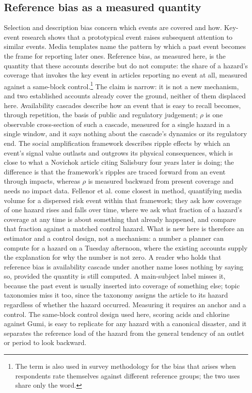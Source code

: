 \documentclass[1p,times]{elsarticle}
\begin{document}
\subsection{Reference bias as a measured quantity}
Selection and description bias \cite{earl2004,strawn2008,zhang2023} concern which events are covered and how. Key-event research \cite{kepplinger1995,brosius1995} shows that a prototypical event raises subsequent attention to similar events. Media templates \cite{kitzinger2000} name the pattern by which a past event becomes the frame for reporting later ones. Reference bias, as measured here, is the quantity that these accounts describe but do not compute: the share of a hazard's coverage that invokes the key event in articles reporting no event at all, measured against a same-block control.\footnote{The term is also used in survey methodology for the bias that arises when respondents rate themselves against different reference groups; the two uses share only the word.} The claim is narrow: it is not a new mechanism, and two established accounts already cover the ground, neither of them displaced here. Availability cascades \cite{kuran1999} describe how an event that is easy to recall becomes, through repetition, the basis of public and regulatory judgement; $\rho$ is one observable cross-section of such a cascade, measured for a single hazard in a single window, and it says nothing about the cascade's dynamics or its regulatory end. The social amplification framework \cite{kasperson1988,pidgeon2003,kasperson2022} describes ripple effects by which an event's signal value outlasts and outgrows its physical consequences, which is close to what a Novichok article citing Salisbury four years later is doing; the difference is that the framework's ripples are traced forward from an event through impacts, whereas $\rho$ is measured backward from present coverage and needs no impact data. Fellenor et al. \cite{fellenor2019} come closest in method, quantifying media volume for a dispersed risk event within that framework; they ask how coverage of one hazard rises and falls over time, where we ask what fraction of a hazard's coverage at any time is about something that already happened, and compare that fraction against a matched control hazard. What is new here is therefore an estimator and a control design, not a mechanism: a number a planner can compute for a hazard on a Tuesday afternoon, where the existing accounts supply the explanation for why the number is not zero. A reader who holds that reference bias is availability cascade under another name loses nothing by saying so, provided the quantity is still computed. A main-subject label misses it, because the past event is usually inserted into coverage of something else; topic taxonomies miss it too, since the taxonomy assigns the article to its hazard regardless of whether the hazard occurred. Measuring it requires an anchor and a control. The same-block control design used here, scoring acids and chlorine against Gumi, is easy to replicate for any hazard with a canonical disaster, and it separates the reference load of the hazard from the general tendency of an outlet or period to look backward.
\end{document}
